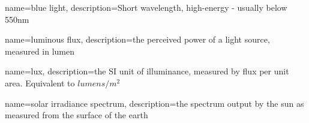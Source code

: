 
\usepackage{glossaries}

\glstoctrue
\makenoidxglossaries

{
    name=blue light,
    description={Short wavelength, high-energy - usually below 550nm}
}

{
	name=luminous flux,
	description={the perceived power of a light source, measured in lumen}
}

{
	name=lux,
	description={the SI unit of illuminance, measured by \gls{flux} per unit area. Equivalent to $lumens/m^2$}
}

{
	name=solar irradiance spectrum,
	description={the spectrum output by the sun as measured from the surface of the earth}
}














